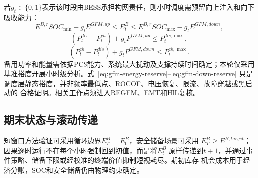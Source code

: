 若$g_t\in\{0,1\}$表示该时段由BESS承担构网责任，则小时调度需预留向上注入和向下
吸收能力：
\begin{equation}
E^{B,r}SOC_{\min}+g_tE^{GFM,up}
\le E_t^B\le
E^{B,r}SOC_{\max}-g_tE^{GFM,down},
\label{eq:gfm-energy-reserve}
\end{equation}
\begin{equation}
(P_t^{dis}-P_t^{ch})+g_tP^{GFM,up}\le P_t^{dis,\max},
\label{eq:gfm-up-reserve}
\end{equation}
\begin{equation}
(P_t^{ch}-P_t^{dis})+g_tP^{GFM,down}\le P_t^{ch,\max}.
\label{eq:gfm-down-reserve}
\end{equation}
备用功率和能量需依据PCS能力、系统最大扰动及支撑持续时间确定；本轮仅采用基准裕度开展小时级分析。式~\eqref{eq:gfm-energy-reserve}--\eqref{eq:gfm-down-reserve}
只是调度层静态裕度，并非频率最低点、ROCOF、电压恢复、限流、故障穿越或黑启动的
合格证明。相关工作点须进入REGFM、EMT和HIL复核\cite{regfm-b1,unifi-v3}。

\subsection{期末状态与滚动传递}

短窗口方法验证可采用循环边界$E_T^B=E_0^B$，安全储备场景可采用
$E_T^B\ge E^{B,target}$；因果逐时运行不在每个小时强制回到初值，而是将$E_t^B$
原样传递到$t+1$，并通过事件策略、储备下限或经校准的终端价值抑制短视耗尽。期初库存
机会成本用于经济分账，SOC和安全储备仍由物理约束确定。
